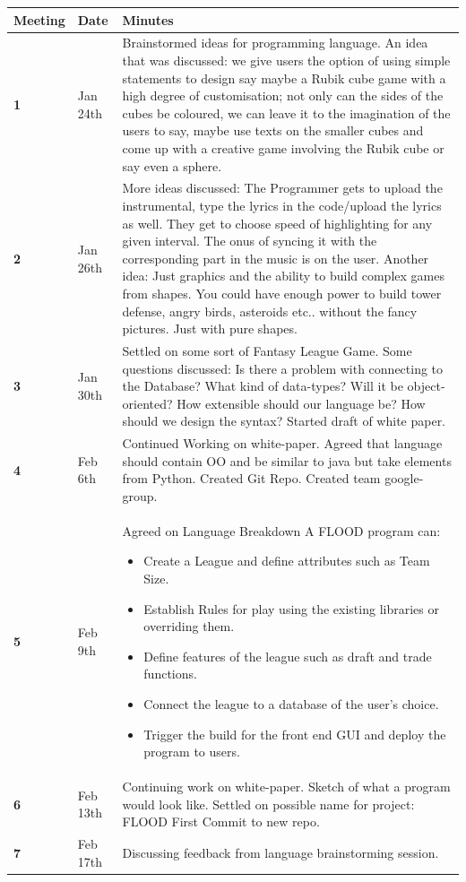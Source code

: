 \documentclass[12pt]{report}
\begin{document}
\begin{flushleft}
\begin{singlespace}
\begin{tabular}{ | p{2cm} | p{1.8cm} | p{12cm} | }
\hline
\textbf{Meeting} & \textbf{Date} & \textbf{Minutes}\\
\hline
\textbf{1} & Jan 24th & Brainstormed ideas for programming language. An idea that was discussed: we give users the option of using simple statements to design say maybe a Rubik cube game with a high degree of customisation; not only can the sides of the cubes be coloured, we can leave it to the imagination of the users to say, maybe use texts on the smaller cubes and come up with a creative game involving the Rubik cube or say even a sphere.\\
\hline
\textbf{2} & Jan 26th & More ideas discussed: The  Programmer gets to upload the instrumental, type the lyrics in the code/upload the lyrics as well. They get to choose speed of highlighting for any given interval. The onus of syncing it with the corresponding part in the music is on the user. Another idea:  Just graphics and the ability to build complex games from shapes. You could have enough power to build tower defense, angry birds, asteroids etc.. without the fancy pictures. Just with pure shapes.\\
\hline
\textbf{3} & Jan 30th & Settled on some sort of Fantasy League Game. Some questions discussed: Is there a problem with connecting to the Database? What kind of data-types? Will it be object-oriented? How extensible should our language be? How should we design the syntax? Started draft of white paper.\\
\hline
\textbf{4} & Feb 6th & Continued Working on white-paper. Agreed that language should contain OO and be similar to java but take elements from Python. Created Git Repo. Created team google-group.\\
\hline
\textbf{5} & Feb 9th & Agreed on Language Breakdown
A FLOOD program can:
\begin{itemize}
\item Create a League and define attributes such as Team Size.
\item Establish Rules for play using the existing libraries or overriding them.
\item Define features of the league such as draft and trade functions.
\item Connect the league to a database of the user's choice.
\item Trigger the build for the front end GUI and deploy the program to users.
\end{itemize}\\
\hline
\textbf{6} & Feb 13th & Continuing work on white-paper. Sketch of what a program would look like. Settled on possible name for project: FLOOD
First Commit to new repo.\\
\hline
\textbf{7} & Feb 17th & Discussing feedback from language brainstorming session.\\
\hline
\end{tabular}
\end{singlespace}
\end{flushleft}
\end{document}

